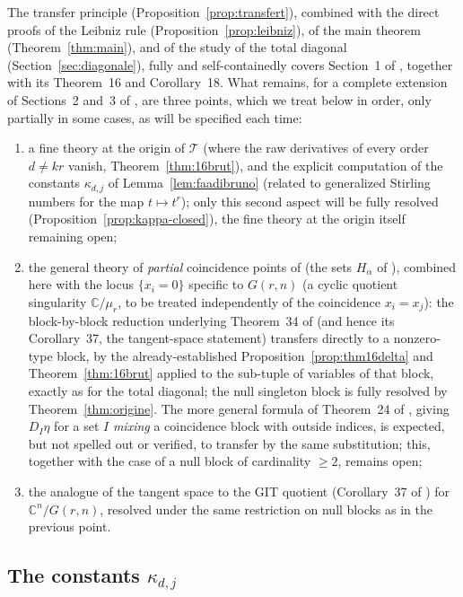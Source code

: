 \documentclass[10pt,a4paper]{amsart}
\newcommand{\CC}{\mathbb{C}}
\begin{document}
The transfer principle (Proposition~\ref{prop:transfert}), combined with the direct proofs of the Leibniz rule (Proposition~\ref{prop:leibniz}), of the main theorem (Theorem~\ref{thm:main}), and of the study of the total diagonal (Section~\ref{sec:diagonale}), fully and self-containedly covers Section~1 of \cite{Ze}, together with its Theorem~16 and Corollary~18. What remains, for a complete extension of Sections~2 and~3 of \cite{Ze}, are three points, which we treat below in order, only partially in some cases, as will be specified each time:
\begin{enumerate}
\item a fine theory at the origin of $\mathcal T$ (where the raw derivatives of every order $d\ne kr$ vanish, Theorem~\ref{thm:16brut}), and the explicit computation of the constants $\kappa_{d,j}$ of Lemma~\ref{lem:faadibruno} (related to generalized Stirling numbers for the map $t\mapsto t^r$); only this second aspect will be fully resolved (Proposition~\ref{prop:kappa-closed}), the fine theory at the origin itself remaining open;
\item the general theory of \emph{partial} coincidence points of \cite[Section~3]{Ze} (the sets $H_\alpha$ of \cite{Ze}), combined here with the locus $\{x_i=0\}$ specific to $G(r,n)$ (a cyclic quotient singularity $\CC/\mu_r$, to be treated independently of the coincidence $x_i=x_j$): the block-by-block reduction underlying Theorem~34 of \cite{Ze} (and hence its Corollary~37, the tangent-space statement) transfers directly to a nonzero-type block, by the already-established Proposition~\ref{prop:thm16delta} and Theorem~\ref{thm:16brut} applied to the sub-tuple of variables of that block, exactly as for the total diagonal; the null singleton block is fully resolved by Theorem~\ref{thm:origine}. The more general formula of Theorem~24 of \cite{Ze}, giving $D_I\eta$ for a set $I$ \emph{mixing} a coincidence block with outside indices, is expected, but not spelled out or verified, to transfer by the same substitution; this, together with the case of a null block of cardinality $\ge2$, remains open;
\item the analogue of the tangent space to the GIT quotient (Corollary~37 of \cite{Ze}) for $\CC^n/G(r,n)$, resolved under the same restriction on null blocks as in the previous point.
\end{enumerate}

\subsection{The constants $\kappa_{d,j}$}
\end{document}
